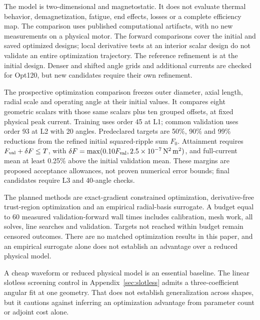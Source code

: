 \documentclass{anvil-paper}
\begin{document}
The model is two-dimensional and magnetostatic. It does not evaluate
thermal behavior, demagnetization, fatigue, end effects, losses or a
complete efficiency map. The comparison uses published computational
artifacts, with no new measurements on a physical motor. The forward comparisons cover the initial and saved optimized designs;
local derivative tests at an interior scalar design do not validate an
entire optimization trajectory. The reference refinement is at the initial
design. Denser and shifted angle grids and additional currents are checked
for Opt120, but new candidates require their own refinement.

The prospective optimization comparison freezes outer diameter, axial
length, radial scale and operating angle at their initial values. It
compares eight geometric scalars with those same scalars plus ten grouped
offsets, at fixed physical peak current. Training uses order 45 at L1;
common validation uses order 93 at L2 with 20 angles. Predeclared targets
are 50\%, 90\% and 99\% reductions from the refined initial squared-ripple
sum $F_0$. Attainment requires $F_{\rm val}+\delta F\leq T$, with
$\delta F=\max(0.10F_{\rm val},2.5\times10^{-7}\,\mathrm{N^2\,m^2})$,
and full-current mean at least 0.25\% above the initial validation mean.
These margins are proposed acceptance allowances, not proven numerical
error bounds; final candidates require L3 and 40-angle checks.

The planned methods are exact-gradient constrained optimization,
derivative-free trust-region optimization and an empirical radial-basis
surrogate. A budget equal to 60 measured validation-forward wall times
includes calibration, mesh work, all solves, line searches and validation.
Targets not reached within budget remain censored outcomes. There are no
matched optimization results in this paper, and an empirical surrogate
alone does not establish an advantage over a reduced physical model.

A cheap waveform or reduced physical model is an essential baseline.
The linear slotless screening control in Appendix~\ref{sec:slotless}
admits a three-coefficient angular fit at one geometry. That does not
establish generalization across shapes, but it cautions against inferring
an optimization advantage from parameter count or adjoint cost alone.
\end{document}
